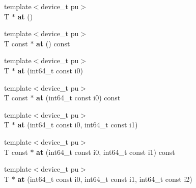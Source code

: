 \begin{DoxyCompactItemize}
\item 
\hypertarget{classsddk_1_1mdarray__base_ac6bf447803cee4def4c168f2dca0d21c}{}{\footnotesize template$<$device\+\_\+t pu$>$ }\\T $\ast$ {\bfseries at} ()\label{classsddk_1_1mdarray__base_ac6bf447803cee4def4c168f2dca0d21c}

\item 
\hypertarget{classsddk_1_1mdarray__base_a0e2b1ebe034832428262174ab7335294}{}{\footnotesize template$<$device\+\_\+t pu$>$ }\\T const $\ast$ {\bfseries at} () const \label{classsddk_1_1mdarray__base_a0e2b1ebe034832428262174ab7335294}

\item 
\hypertarget{classsddk_1_1mdarray__base_a1e70a9e86a480a6986f70dbc32c62ce8}{}{\footnotesize template$<$device\+\_\+t pu$>$ }\\T $\ast$ {\bfseries at} (int64\+\_\+t const i0)\label{classsddk_1_1mdarray__base_a1e70a9e86a480a6986f70dbc32c62ce8}

\item 
\hypertarget{classsddk_1_1mdarray__base_ab34b0d4535d75f91417eb952e25413c0}{}{\footnotesize template$<$device\+\_\+t pu$>$ }\\T const $\ast$ {\bfseries at} (int64\+\_\+t const i0) const \label{classsddk_1_1mdarray__base_ab34b0d4535d75f91417eb952e25413c0}

\item 
\hypertarget{classsddk_1_1mdarray__base_a8fb881c005f58acf0830e55477b55734}{}{\footnotesize template$<$device\+\_\+t pu$>$ }\\T $\ast$ {\bfseries at} (int64\+\_\+t const i0, int64\+\_\+t const i1)\label{classsddk_1_1mdarray__base_a8fb881c005f58acf0830e55477b55734}

\item 
\hypertarget{classsddk_1_1mdarray__base_a473d73db66383f40c660fe314e184df4}{}{\footnotesize template$<$device\+\_\+t pu$>$ }\\T const $\ast$ {\bfseries at} (int64\+\_\+t const i0, int64\+\_\+t const i1) const \label{classsddk_1_1mdarray__base_a473d73db66383f40c660fe314e184df4}

\item 
\hypertarget{classsddk_1_1mdarray__base_a24de7d0fbc95023268b85625e1a72d0f}{}{\footnotesize template$<$device\+\_\+t pu$>$ }\\T $\ast$ {\bfseries at} (int64\+\_\+t const i0, int64\+\_\+t const i1, int64\+\_\+t const i2)\label{classsddk_1_1mdarray__base_a24de7d0fbc95023268b85625e1a72d0f}


\end{DoxyCompactItemize}
